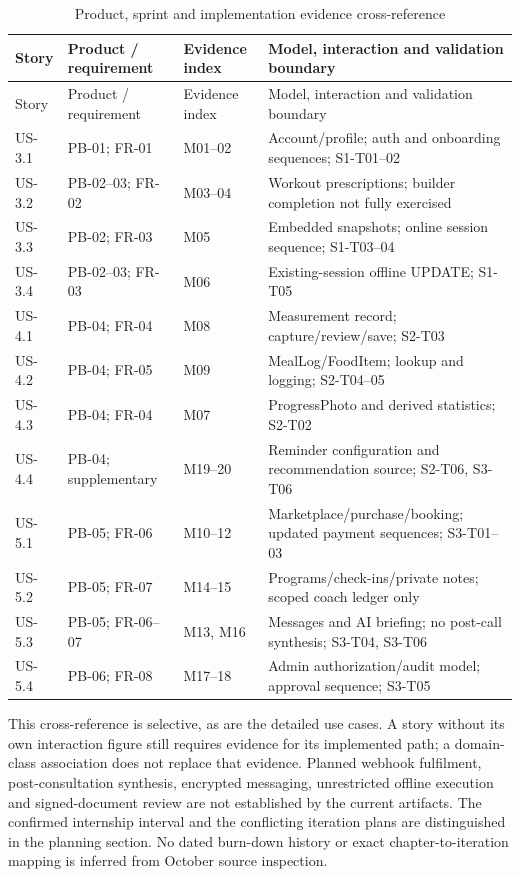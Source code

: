 \documentclass[12pt,a4paper,openany]{report}
\begin{document}
\begingroup
\footnotesize
\setlength{\tabcolsep}{3pt}
\renewcommand{\arraystretch}{1.2}
\begin{longtable}{|L{1.35cm}|L{3.0cm}|L{1.75cm}|L{8.0cm}|}
\caption{Product, sprint and implementation evidence cross-reference}\label{tab:sprint-traceability} \\
\hline
{}
Story & Product / requirement & Evidence index & Model, interaction and validation boundary \\ \hline
\endfirsthead
\hline
{}
Story & Product / requirement & Evidence index & Model, interaction and validation boundary \\ \hline
\endhead
US-3.1 & PB-01; FR-01 & M01--02 & Account/profile; auth and onboarding sequences; S1-T01--02 \\ \hline
US-3.2 & PB-02--03; FR-02 & M03--04 & Workout prescriptions; builder completion not fully exercised \\ \hline
US-3.3 & PB-02; FR-03 & M05 & Embedded snapshots; online session sequence; S1-T03--04 \\ \hline
US-3.4 & PB-02--03; FR-03 & M06 & Existing-session offline UPDATE; S1-T05 \\ \hline
US-4.1 & PB-04; FR-04 & M08 & Measurement record; capture/review/save; S2-T03 \\ \hline
US-4.2 & PB-04; FR-05 & M09 & MealLog/FoodItem; lookup and logging; S2-T04--05 \\ \hline
US-4.3 & PB-04; FR-04 & M07 & ProgressPhoto and derived statistics; S2-T02 \\ \hline
US-4.4 & PB-04; supplementary & M19--20 & Reminder configuration and recommendation source; S2-T06, S3-T06 \\ \hline
US-5.1 & PB-05; FR-06 & M10--12 & Marketplace/purchase/booking; updated payment sequences; S3-T01--03 \\ \hline
US-5.2 & PB-05; FR-07 & M14--15 & Programs/check-ins/private notes; scoped coach ledger only \\ \hline
US-5.3 & PB-05; FR-06--07 & M13, M16 & Messages and AI briefing; no post-call synthesis; S3-T04, S3-T06 \\ \hline
US-5.4 & PB-06; FR-08 & M17--18 & Admin authorization/audit model; approval sequence; S3-T05 \\ \hline
\end{longtable}
\endgroup

This cross-reference is selective, as are the detailed use cases. A story without its own interaction figure still requires evidence for its implemented path; a domain-class association does not replace that evidence. Planned webhook fulfilment, post-consultation synthesis, encrypted messaging, unrestricted offline execution and signed-document review are not established by the current artifacts. The confirmed internship interval and the conflicting iteration plans are distinguished in the planning section. No dated burn-down history or exact chapter-to-iteration mapping is inferred from October source inspection.
\end{document}
